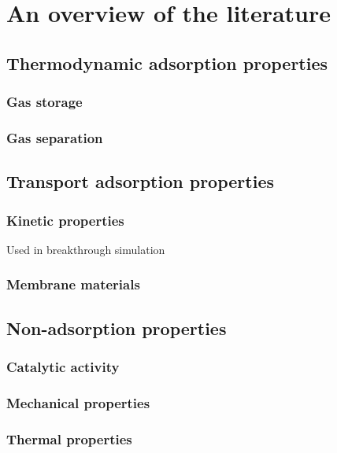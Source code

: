 \documentclass[main.tex]{subfiles}
\begin{document}
\section{An overview of the literature}

\subsection{Thermodynamic adsorption properties}

\subsubsection{Gas storage}

\subsubsection{Gas separation}

\subsection{Transport adsorption properties}

\subsubsection{Kinetic properties}

Used in breakthrough simulation

\subsubsection{Membrane materials}

\subsection{Non-adsorption properties}

\subsubsection{Catalytic activity}

\subsubsection{Mechanical properties}

\subsubsection{Thermal properties}
\end{document}
